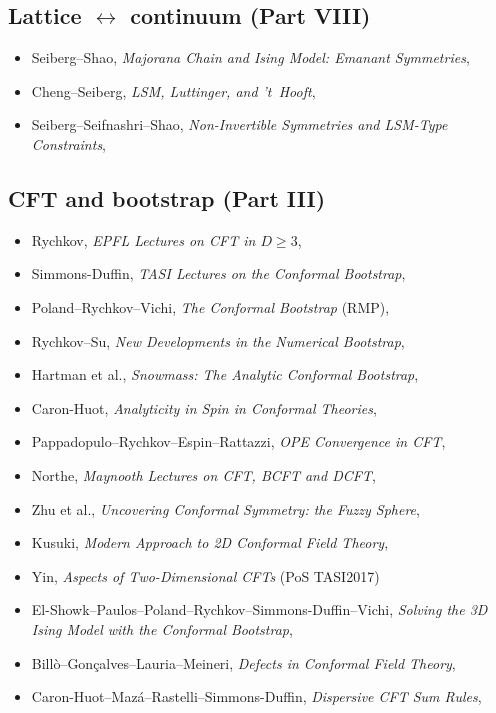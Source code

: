 \subsection*{Lattice $\leftrightarrow$ continuum (Part VIII)}
\begin{itemize}
\item[$\circ$] Seiberg--Shao, \emph{Majorana Chain and Ising Model: Emanant Symmetries}, 
\item[$\circ$] Cheng--Seiberg, \emph{LSM, Luttinger, and 't~Hooft}, 
\item[$\circ$] Seiberg--Seifnashri--Shao, \emph{Non-Invertible Symmetries and LSM-Type Constraints}, 
\end{itemize}

\subsection*{CFT and bootstrap (Part III)}
\begin{itemize}
\item[$\bullet$] Rychkov, \emph{EPFL Lectures on CFT in $D\ge 3$}, 
\item[$\bullet$] Simmons-Duffin, \emph{TASI Lectures on the Conformal Bootstrap}, 
\item[$\bullet$] Poland--Rychkov--Vichi, \emph{The Conformal Bootstrap} (RMP), 
\item[$\bullet$] Rychkov--Su, \emph{New Developments in the Numerical Bootstrap}, 
\item[$\bullet$] Hartman et al., \emph{Snowmass: The Analytic Conformal Bootstrap}, 
\item[$\circ$] Caron-Huot, \emph{Analyticity in Spin in Conformal Theories}, 
\item[$\circ$] Pappadopulo--Rychkov--Espin--Rattazzi, \emph{OPE Convergence in CFT}, 
\item[$\bullet$] Northe, \emph{Maynooth Lectures on CFT, BCFT and DCFT}, 
\item[$\circ$] Zhu et al., \emph{Uncovering Conformal Symmetry: the Fuzzy Sphere}, 
\item[$\bullet$] Kusuki, \emph{Modern Approach to 2D Conformal Field Theory}, 
\item[$\bullet$] Yin, \emph{Aspects of Two-Dimensional CFTs} (PoS TASI2017)
\item[$\circ$] El-Showk--Paulos--Poland--Rychkov--Simmons-Duffin--Vichi, \emph{Solving the 3D Ising Model with the Conformal Bootstrap}, 
\item[$\circ$] Billò--Gon\c{c}alves--Lauria--Meineri, \emph{Defects in Conformal Field Theory}, 
\item[$\circ$] Caron-Huot--Maz\'a--Rastelli--Simmons-Duffin, \emph{Dispersive CFT Sum Rules}, 
\end{itemize}

